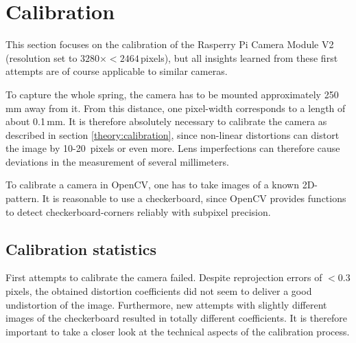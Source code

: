 \clearpage
\section{Calibration}
This section focuses on the calibration of the Rasperry Pi Camera Module V2 (resolution set to $3280\times <2464$\,pixels),
but all insights learned from these first attempts are of course applicable to similar cameras.

To capture the whole spring, the camera has to be mounted approximately 250\,mm away from it.
From this distance, one pixel-width corresponds to a length of about 0.1\,mm.
It is therefore absolutely necessary to calibrate the camera as described in section \ref{theory:calibration}, since non-linear distortions can distort the image by 10-20\, pixels or even more.
Lens imperfections can therefore cause deviations in the measurement of several millimeters.

To calibrate a camera in OpenCV, one has to take images of a known 2D-pattern.
It is reasonable to use a checkerboard, since OpenCV provides functions to detect checkerboard-corners reliably with subpixel precision.

\subsection{Calibration statistics\label{development:statistics}}
First attempts to calibrate the camera failed.
Despite reprojection errors of $<0.3$ pixels, the obtained distortion coefficients did not seem to deliver a good undistortion of the image.
Furthermore, new attempts with slightly different images of the checkerboard resulted in totally different coefficients. 
It is therefore important to take a closer look at the technical aspects of the calibration process.

